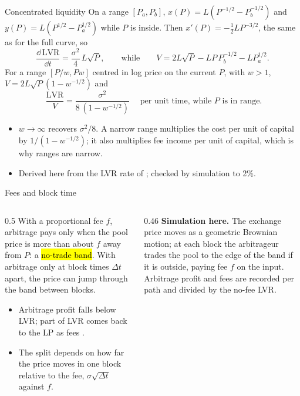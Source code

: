 \documentclass[aspectratio=169,10pt]{beamer}
\begin{document}
\begin{frame}{Concentrated liquidity}
  \small
  On a range $[P_a, P_b]$, $x(P) = L(P^{-1/2} - P_b^{-1/2})$ and $y(P) = L(P^{1/2} - P_a^{1/2})$ while $P$ is inside. Then $x'(P) = -\tfrac12 LP^{-3/2}$, the same as for the full curve, so
  \[ \frac{\dd\,\mathrm{LVR}}{\dd t} = \frac{\sigma^2}{4}\,L\sqrt P , \qquad\text{while}\qquad V = 2L\sqrt P - LP\,P_b^{-1/2} - L P_a^{1/2}. \]
  For a range $[P/w, Pw]$ centred in log price on the current $P$, with $w > 1$, $V = 2L\sqrt P(1 - w^{-1/2})$ and
  \[ \boxed{\;\frac{\mathrm{LVR}}{V} = \frac{\sigma^2}{8\,(1 - w^{-1/2})}\;} \quad\text{per unit time, while } P \text{ is in range.} \]
  \begin{itemize}
    \item $w \to \infty$ recovers $\sigma^2/8$. A narrow range multiplies the cost per unit of capital by $1/(1 - w^{-1/2})$; it also multiplies fee income per unit of capital, which is why ranges are narrow.
    \item Derived here from the LVR rate of \citet{milionis2022automated}; checked by simulation to 2\%.
  \end{itemize}
\end{frame}

\begin{frame}{Fees and block time}
  \small
  \begin{columns}[T]
    \begin{column}{0.5\textwidth}
      With a proportional fee $f$, arbitrage pays only when the pool price is more than about $f$ away from $P$: a \hl{no-trade band}. With arbitrage only at block times $\Delta t$ apart, the price can jump through the band between blocks.
      \begin{itemize}
        \item Arbitrage profit falls below LVR; part of LVR comes back to the LP as fees \citep{milionis2023fees}.
        \item The split depends on how far the price moves in one block relative to the fee, $\sigma\sqrt{\Delta t}$ against $f$.
      \end{itemize}
    \end{column}
    \begin{column}{0.46\textwidth}
      \textbf{Simulation here.} The exchange price moves as a geometric Brownian motion; at each block the arbitrageur trades the pool to the edge of the band if it is outside, paying fee $f$ on the input. Arbitrage profit and fees are recorded per path and divided by the no-fee LVR.
    \end{column}
  \end{columns}
\end{frame}
\end{document}
